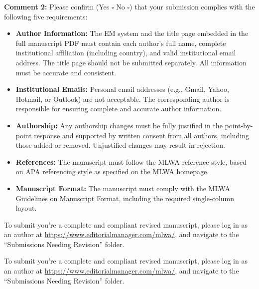 \documentclass[a4paper,11pt]{article}
\newcommand{\reviewercomment}[2]{%
    \begin{reviewerscomment}
        \textbf{Comment #1:} #2
    \end{reviewerscomment}
}
\begin{document}
\reviewercomment{2}{
Please confirm (Yes $\square$ No $\square$) that your submission complies with
the following five requirements:

\begin{itemize}

    \item \textbf{Author Information:}
    The EM system and the title page embedded in the full manuscript PDF must
    contain each author's full name, complete institutional affiliation
    (including country), and valid institutional email address. The title page
    should not be submitted separately. All information must be accurate and
    consistent.

    \item \textbf{Institutional Emails:}
    Personal email addresses (e.g., Gmail, Yahoo, Hotmail, or Outlook) are not
    acceptable. The corresponding author is responsible for ensuring complete
    and accurate author information.

    \item \textbf{Authorship:}
    Any authorship changes must be fully justified in the point-by-point response
    and supported by written consent from all authors, including those added or
    removed. Unjustified changes may result in rejection.

    \item \textbf{References:}
    The manuscript must follow the MLWA reference style, based on APA referencing
    style as specified on the MLWA homepage.

    \item \textbf{Manuscript Format:}
    The manuscript must comply with the MLWA Guidelines on Manuscript Format,
    including the required single-column layout.

\end{itemize}

To submit you're a complete and compliant revised manuscript, please log in as
an author at \url{https://www.editorialmanager.com/mlwa/}, and navigate to the
``Submissions Needing Revision'' folder.

To submit you're a complete and compliant revised manuscript, please log in as
an author at \url{https://www.editorialmanager.com/mlwa/}, and navigate to the
``Submissions Needing Revision'' folder.
}


\end{document}

